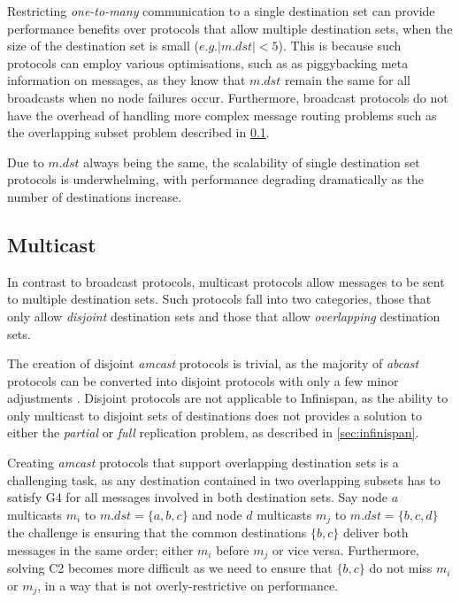 	Restricting \emph{one-to-many} communication to a single destination set can provide performance benefits over protocols that allow multiple destination sets, when the size of the destination set is small ($e.g. \left\vert{m.dst}\right\vert < 5$).   This is because such protocols can employ various optimisations, such as as piggybacking meta information on messages, as they know that $m.dst$ remain the same for all broadcasts when no node failures occur.  Furthermore, broadcast protocols do not have the overhead of handling more complex message routing problems such as the overlapping subset problem described in \ref{ssec:atomic_multicast}.  
	
	Due to $m.dst$ always being the same, the scalability of single destination set protocols is underwhelming, with performance degrading dramatically as the number of destinations increase.  
	
	\subsection{Multicast}\label{ssec:atomic_multicast}
	In contrast to broadcast protocols, multicast protocols allow messages to be sent to multiple destination sets.  Such protocols fall into two categories, those that only allow \emph{disjoint} destination sets and those that allow \emph{overlapping} destination sets.  
	
	The creation of disjoint \emph{amcast} protocols is trivial, as the majority of \emph{abcast} protocols can be converted into disjoint protocols with only a few minor adjustments \cite{Defago:2004:TOB:1041680.1041682}.  Disjoint protocols are not applicable to Infinispan, as the ability to only multicast to disjoint sets of destinations does not provides a solution to either the \emph{partial} or \emph{full} replication problem, as described in \ref{sec:infinispan}.  
        
        Creating \emph{amcast} protocols that support overlapping destination sets is a challenging task, as any destination contained in two overlapping subsets has to satisfy G4 for all messages involved in both destination sets.  Say node $a$ multicasts $m_i$ to $m.dst = \{a,b,c\}$ and node $d$ multicasts $m_j$ to $m.dst = \{b,c,d\}$ the challenge is ensuring that the common destinations $\{b,c\}$ deliver both messages in the same order; either $m_i$ before $m_j$ or vice versa.  Furthermore, solving C2 becomes more difficult as we need to ensure that $\{b,c\}$ do not miss $m_i$ or $m_j$, in a way that is not overly-restrictive on performance.  
        
